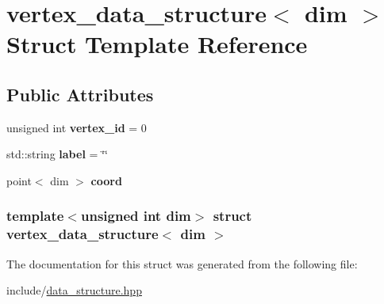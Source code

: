 \hypertarget{structvertex__data__structure}{
\section{vertex\_\-data\_\-structure$<$ dim $>$ Struct Template Reference}
\label{structvertex__data__structure}
}
\subsection*{Public Attributes}
\begin{DoxyCompactItemize}
\item 
\hypertarget{structvertex__data__structure_a974f87b132b5a0948ccf069170d3a4ba}{
unsigned int {\bfseries vertex\_\-id} = 0}
\label{structvertex__data__structure_a974f87b132b5a0948ccf069170d3a4ba}

\item 
\hypertarget{structvertex__data__structure_a48c25a9d4e52b5a2cdec83d9633a0c5c}{
std::string {\bfseries label} = \char`\"{}\char`\"{}}
\label{structvertex__data__structure_a48c25a9d4e52b5a2cdec83d9633a0c5c}

\item 
\hypertarget{structvertex__data__structure_a620eae50faa20408863c22e01689387e}{
point$<$ dim $>$ {\bfseries coord}}
\label{structvertex__data__structure_a620eae50faa20408863c22e01689387e}

\end{DoxyCompactItemize}
\subsubsection*{template$<$unsigned int dim$>$ struct vertex\_\-data\_\-structure$<$ dim $>$}



The documentation for this struct was generated from the following file:\begin{DoxyCompactItemize}
\item 
include/\hyperlink{data__structure_8hpp}{data\_\-structure.hpp}\end{DoxyCompactItemize}
